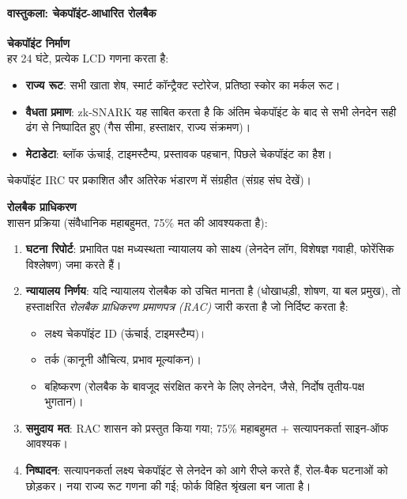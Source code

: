 \documentclass[11pt]{article}
\begin{document}
\begin{itemize}[noitemsep]
\begin{itemize}[noitemsep]
\paragraph{वास्तुकला: चेकपॉइंट-आधारित रोलबैक}
\textbf{चेकपॉइंट निर्माण}\\
हर 24 घंटे, प्रत्येक LCD गणना करता है:
\begin{itemize}[noitemsep]
  \item \textbf{राज्य रूट}: सभी खाता शेष, स्मार्ट कॉन्ट्रैक्ट स्टोरेज, प्रतिष्ठा स्कोर का मर्कल रूट।
  \item \textbf{वैधता प्रमाण}: zk-SNARK यह साबित करता है कि अंतिम चेकपॉइंट के बाद से सभी लेनदेन सही ढंग से निष्पादित हुए (गैस सीमा, हस्ताक्षर, राज्य संक्रमण)।
  \item \textbf{मेटाडेटा}: ब्लॉक ऊंचाई, टाइमस्टैम्प, प्रस्तावक पहचान, पिछले चेकपॉइंट का हैश।
\end{itemize}
चेकपॉइंट IRC पर प्रकाशित और अतिरेक भंडारण में संग्रहीत (संग्रह संघ देखें)।

\textbf{रोलबैक प्राधिकरण}\\
शासन प्रक्रिया (संवैधानिक महाबहुमत, 75\% मत की आवश्यकता है):
\begin{enumerate}[noitemsep]
  \item \textbf{घटना रिपोर्ट}: प्रभावित पक्ष मध्यस्थता न्यायालय को साक्ष्य (लेनदेन लॉग, विशेषज्ञ गवाही, फोरेंसिक विश्लेषण) जमा करते हैं।
  \item \textbf{न्यायालय निर्णय}: यदि न्यायालय रोलबैक को उचित मानता है (धोखाधड़ी, शोषण, या बल प्रमुख), तो हस्ताक्षरित \emph{रोलबैक प्राधिकरण प्रमाणपत्र (RAC)} जारी करता है जो निर्दिष्ट करता है:
    \begin{itemize}[noitemsep]
      \item लक्ष्य चेकपॉइंट ID (ऊंचाई, टाइमस्टैम्प)।
      \item तर्क (कानूनी औचित्य, प्रभाव मूल्यांकन)।
      \item बहिष्करण (रोलबैक के बावजूद संरक्षित करने के लिए लेनदेन, जैसे, निर्दोष तृतीय-पक्ष भुगतान)।
    \end{itemize}
  \item \textbf{समुदाय मत}: RAC शासन को प्रस्तुत किया गया; 75\% महाबहुमत + सत्यापनकर्ता साइन-ऑफ आवश्यक।
  \item \textbf{निष्पादन}: सत्यापनकर्ता लक्ष्य चेकपॉइंट से लेनदेन को आगे रीप्ले करते हैं, रोल-बैक घटनाओं को छोड़कर। नया राज्य रूट गणना की गई; फोर्क विहित श्रृंखला बन जाता है।
\end{enumerate}


\end{itemize}
\end{itemize}
\end{document}
